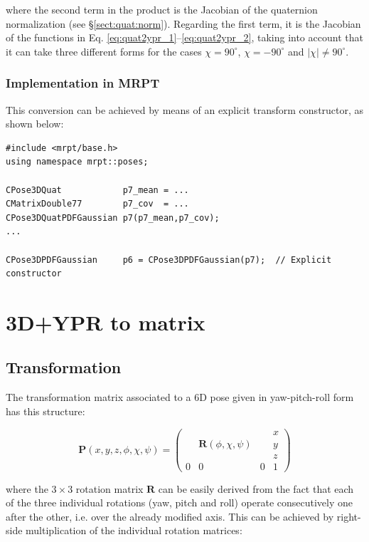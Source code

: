 \documentclass[a4paper,10pt]{report}
\begin{document}
\noindent where the second term in the product is the Jacobian of the quaternion 
normalization (see \S \ref{sect:quat:norm}). Regarding the first term, it is the 
Jacobian of the functions in Eq. \ref{eq:quat2ypr_1}--\ref{eq:quat2ypr_2}, taking
into account that it can take three different forms for the cases $\chi=90^\circ$,
$\chi=-90^\circ$ and $|\chi| \neq 90^\circ$.

\subsubsection{Implementation in MRPT}

This conversion can be achieved by means of an explicit transform constructor, as shown below:

\begin{lstlisting}
#include <mrpt/base.h> 
using namespace mrpt::poses; 

CPose3DQuat            p7_mean = ...
CMatrixDouble77        p7_cov  = ...
CPose3DQuatPDFGaussian p7(p7_mean,p7_cov);
...

CPose3DPDFGaussian     p6 = CPose3DPDFGaussian(p7);  // Explicit constructor
\end{lstlisting}


\section{3D+YPR to matrix }
\label{sect:ypr2mat}

\subsection{Transformation}

The transformation matrix associated to a 6D pose given in yaw-pitch-roll form has this structure:

\begin{equation}
\mathbf{P}(x,y,z,\phi,\chi,\psi)=\left(
  \begin{array}{ccc|c}
   & & & x \\
   & \mathbf{R}(\phi,\chi,\psi) & & y \\
   & & & z \\ \hline
   0 & 0 & 0& 1
  \end{array}
\right)
\label{eq:matP_ypr}
\end{equation}

\noindent where the $3 \times 3$ rotation matrix $\mathbf{R}$ can be easily derived 
from the fact that each of the three individual rotations (yaw, pitch and roll) operate
consecutively one after the other, i.e. over the already modified axis. 
This can be achieved by right-side multiplication of the individual rotation matrices:
\end{document}
